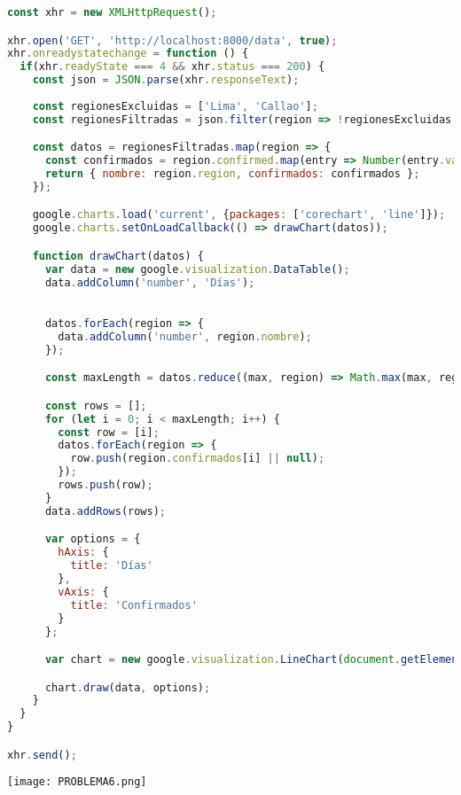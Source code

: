 \documentclass{article}
\begin{document}
\begin{itemize}
\begin{lstlisting}[language=JavaScript, caption=PROBLEMA6-SCRIPT]
const xhr = new XMLHttpRequest(); 

xhr.open('GET', 'http://localhost:8000/data', true);
xhr.onreadystatechange = function () {
  if(xhr.readyState === 4 && xhr.status === 200) {
    const json = JSON.parse(xhr.responseText);
    
    const regionesExcluidas = ['Lima', 'Callao'];
    const regionesFiltradas = json.filter(region => !regionesExcluidas.includes(region.region));

    const datos = regionesFiltradas.map(region => {
      const confirmados = region.confirmed.map(entry => Number(entry.value));
      return { nombre: region.region, confirmados: confirmados };
    });

    google.charts.load('current', {packages: ['corechart', 'line']});
    google.charts.setOnLoadCallback(() => drawChart(datos));

    function drawChart(datos) {
      var data = new google.visualization.DataTable();
      data.addColumn('number', 'Días');
      

      datos.forEach(region => {
        data.addColumn('number', region.nombre);
      });

      const maxLength = datos.reduce((max, region) => Math.max(max, region.confirmados.length), 0);

      const rows = [];
      for (let i = 0; i < maxLength; i++) {
        const row = [i];
        datos.forEach(region => {
          row.push(region.confirmados[i] || null);
        });
        rows.push(row);
      }
      data.addRows(rows);

      var options = {
        hAxis: {
          title: 'Días'
        },
        vAxis: {
          title: 'Confirmados'
        }
      };

      var chart = new google.visualization.LineChart(document.getElementById('chart_div'));

      chart.draw(data, options);
    }
  }
}

xhr.send();
            \end{lstlisting}  

            \newline \newline \newline
            \texttt{[image: PROBLEMA6.png]}
            \newline \newline \newline


\end{itemize}
\end{document}
